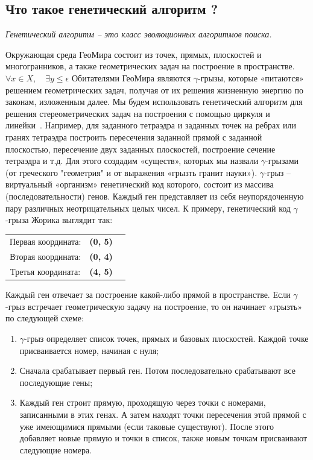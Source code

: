 \documentclass[a4paper,12pt]{article}
\theoremstyle{plain} %
\numberwithin{equation}{section}
\theoremstyle{definition} %
\theoremstyle{remark} %
\begin{document}
\subsection{ Что такое генетический алгоритм ?}
\begin{displayquote}
\textit{
  Генетический алгоритм – это класс эволюционных алгоритмов поиска.
}
\end{displayquote}
Окружающая среда ГеоМира состоит из точек, прямых, плоскостей и многогранников, а также геометрических задач на построение в пространстве.$\forall x \in X, \quad \exists y \leq \epsilon$
Обитателями ГеоМира являются $\gamma$-грызы, которые «питаются» решением геометрических задач, получая от их решения жизненную энергию по законам, изложенным далее. Мы будем использовать генетический алгоритм для решения стереометрических задач на построения с помощью циркуля и линейки~\cite{Anna2019Jun}. Например, для заданного тетраэдра и заданных точек на ребрах или гранях тетраэдра построить пересечения заданной прямой с заданной плоскостью, пересечение двух заданных плоскостей, построение сечение тетраэдра и т.д. 
Для этого создадим «существ», которых мы назвали $\gamma$-грызами (от греческого "геометрия" и от выражения «грызть гранит науки»). 
$\gamma$-грыз – виртуальный «организм» генетический код которого, состоит из массива (последовательности) генов. Каждый ген представляет из себя неупорядоченную пару различных неотрицательных целых чисел. К примеру, генетический код $\gamma$-грыза Жорика выглядит так:
\begin{center}
\begin{tabular}{ccc}
Первая координата: & \textbf{(0, 5)} \\
Вторая координата: & \textbf{(0, 4)} \\
Третья координата: & \textbf{(4, 5)} \\
\end{tabular}
\end{center}
Каждый ген отвечает за построение какой-либо прямой в пространстве. Если $\gamma$-грыз встречает геометрическую задачу на построение, то он начинает «грызть» по следующей схеме:
\begin{enumerate}
    \item $\gamma$-грыз определяет список точек, прямых и базовых плоскостей. Каждой точке присваивается номер, начиная с нуля;
	\item Сначала срабатывает первый ген. Потом последовательно срабатывают все последующие гены;
	\item Каждый ген строит прямую, проходящую через точки с номерами, записанными в этих генах. А затем находят точки пересечения этой прямой с уже имеющимися прямыми (если таковые существуют). После этого добавляет новые прямую и точки в список, также новым точкам присваивают следующие номера.
\end{enumerate}
\end{document}
